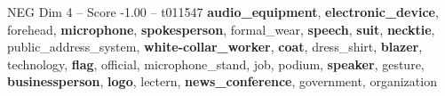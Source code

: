 \begin{textsample}{NEG Dim 4 – Score -1.00 – t011547}  \label{ex:f4_neg_020}
\textbf{audio\_equipment}, \textbf{electronic\_device}, forehead, \textbf{microphone}, \textbf{spokesperson}, formal\_wear, \textbf{speech}, \textbf{suit}, \textbf{necktie}, public\_address\_system, \textbf{white-collar\_worker}, \textbf{coat}, dress\_shirt, \textbf{blazer}, technology, \textbf{flag}, official, microphone\_stand, job, podium, \textbf{speaker}, gesture, \textbf{businessperson}, \textbf{logo}, lectern, \textbf{news\_conference}, government, organization

\end{textsample}

